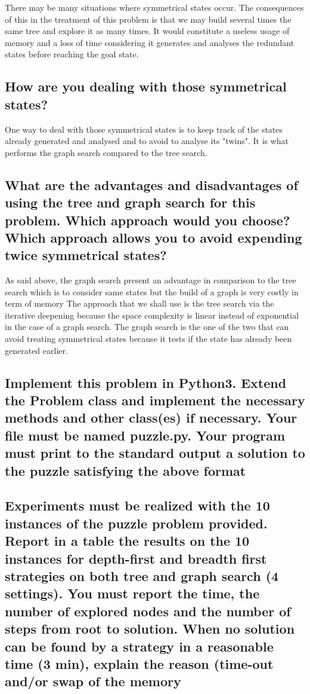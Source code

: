 \documentclass[a4paper,10pt]{article}
\begin{document}
	There may be many situations where symmetrical states occur. The consequences of this in the treatment of this problem	is that we may build several times the same tree and explore it as many times. It would constitute a useless usage of memory and a loss of time considering it generates and analyses the redundant states before reaching the goal state.
	
	\subsection{How are you dealing with those symmetrical states?}
	
	One way to deal with those symmetrical states is to keep track of the states already generated and analysed and to avoid to analyse its "twins". It is what performs the graph search compared to the tree search.
	
	\subsection{What are the advantages and disadvantages of using the tree and graph search for this problem. Which approach would you choose? Which approach allows you to avoid expending twice symmetrical states?}

	As said above, the graph search present an advantage in comparison to the tree search which is to consider same states but the build of a graph is very costly in term of memory The approach that we shall use is the tree search via the iterative deepening because the space complexity is linear instead of exponential in the case of a graph search.
	The graph search is the one of the two that can avoid treating symmetrical states because it tests if the state has already been generated earlier.
	
	\subsection{Implement this problem in Python3. Extend the Problem class and implement the necessary methods and other class(es) if necessary. Your file must be named puzzle.py. Your program must print to the standard output a solution to the puzzle satisfying the above format}
	
	\subsection{Experiments must be realized with the 10 instances of the puzzle problem provided. Report in a table the results on the 10 instances for depth-first and breadth first strategies on both tree and graph search (4 settings). You must report the time, the number of explored nodes and the number of steps from root to solution. When no solution can be found by a strategy in a reasonable time (3 min), explain the reason (time-out and/or swap of the memory}
	
\end{document}
